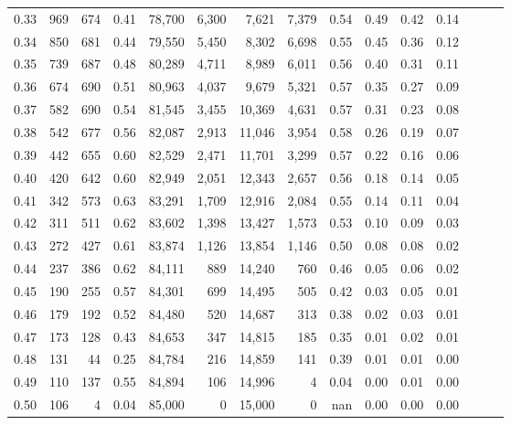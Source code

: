 \begin{tabular}{rrrrrrrrrrrrrrr}
0.33 &    969 &  674 &  0.41 &  78,700 &   6,300 &   7,621 &   7,379 &  0.54 &  0.49 &  0.42 &      0.14 \\
0.34 &    850 &  681 &  0.44 &  79,550 &   5,450 &   8,302 &   6,698 &  0.55 &  0.45 &  0.36 &      0.12 \\
0.35 &    739 &  687 &  0.48 &  80,289 &   4,711 &   8,989 &   6,011 &  0.56 &  0.40 &  0.31 &      0.11 \\
0.36 &    674 &  690 &  0.51 &  80,963 &   4,037 &   9,679 &   5,321 &  0.57 &  0.35 &  0.27 &      0.09 \\
0.37 &    582 &  690 &  0.54 &  81,545 &   3,455 &  10,369 &   4,631 &  0.57 &  0.31 &  0.23 &      0.08 \\
0.38 &    542 &  677 &  0.56 &  82,087 &   2,913 &  11,046 &   3,954 &  0.58 &  0.26 &  0.19 &      0.07 \\
0.39 &    442 &  655 &  0.60 &  82,529 &   2,471 &  11,701 &   3,299 &  0.57 &  0.22 &  0.16 &      0.06 \\
0.40 &    420 &  642 &  0.60 &  82,949 &   2,051 &  12,343 &   2,657 &  0.56 &  0.18 &  0.14 &      0.05 \\
0.41 &    342 &  573 &  0.63 &  83,291 &   1,709 &  12,916 &   2,084 &  0.55 &  0.14 &  0.11 &      0.04 \\
0.42 &    311 &  511 &  0.62 &  83,602 &   1,398 &  13,427 &   1,573 &  0.53 &  0.10 &  0.09 &      0.03 \\
0.43 &    272 &  427 &  0.61 &  83,874 &   1,126 &  13,854 &   1,146 &  0.50 &  0.08 &  0.08 &      0.02 \\
0.44 &    237 &  386 &  0.62 &  84,111 &     889 &  14,240 &     760 &  0.46 &  0.05 &  0.06 &      0.02 \\
0.45 &    190 &  255 &  0.57 &  84,301 &     699 &  14,495 &     505 &  0.42 &  0.03 &  0.05 &      0.01 \\
0.46 &    179 &  192 &  0.52 &  84,480 &     520 &  14,687 &     313 &  0.38 &  0.02 &  0.03 &      0.01 \\
0.47 &    173 &  128 &  0.43 &  84,653 &     347 &  14,815 &     185 &  0.35 &  0.01 &  0.02 &      0.01 \\
0.48 &    131 &   44 &  0.25 &  84,784 &     216 &  14,859 &     141 &  0.39 &  0.01 &  0.01 &      0.00 \\
0.49 &    110 &  137 &  0.55 &  84,894 &     106 &  14,996 &       4 &  0.04 &  0.00 &  0.01 &      0.00 \\
0.50 &    106 &    4 &  0.04 &  85,000 &       0 &  15,000 &       0 &   nan &  0.00 &  0.00 &      0.00 \\

\end{tabular}
